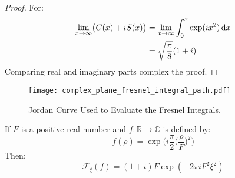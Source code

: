     \begin{proof}
        For:
        \begin{align}
            \underset{x\rightarrow\infty}{\lim}
                \big(C(x)+iS(x)\big)
            &=\underset{x\rightarrow\infty}{\lim}
                \int_{0}^{x}\exp(ix^{2})\mathop{}\!\mathrm{d}{x}\\
            &=\sqrt{\frac{\pi}{8}}(1+i)
        \end{align}
        Comparing real and imaginary parts complex the proof.
    \end{proof}
    \begin{figure}[H]
        \centering
        \captionsetup{type=figure}
        \texttt{[image: complex\_plane\_fresnel\_integral\_path.pdf]}
        \caption{Jordan Curve Used to Evaluate the Fresnel Integrals.}
        \label{fig:Jordan_Curve_Fresnel_Integrals}
    \end{figure}
    \par\hfill\par
    \begin{theorem}
        If $F$ is a positive real number and
        $f:\mathbb{R}\rightarrow\mathbb{C}$ is defined by:
        \begin{equation}
            f(\rho)=
                \exp\bigg(
                    i\frac{\pi}{2}
                    \Big(\frac{\rho}{F}\Big)^{2}
                \bigg)
        \end{equation}
        Then:
        \begin{equation}
            \mathcal{F}_{\xi}(f)
            =(1+i)F\exp(\minus{2}\pi{i}F^{2}\xi^{2})
        \end{equation}
    \end{theorem}

